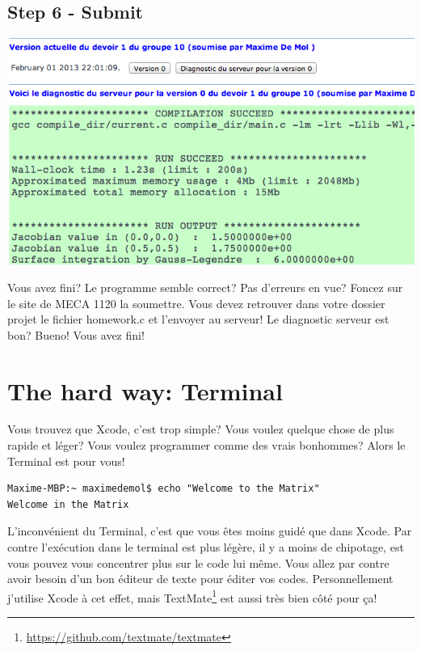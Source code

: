 \documentclass[11pt,a4paper]{article}
\begin{document}
\subsection{Step 6 - Submit}
\label{subsec:submit}
\begin{minipage}[c]{.40\linewidth}
\includegraphics[width=\linewidth]{submit.png}
\end{minipage} \hfill
\begin{minipage}[c]{.50\linewidth}
Vous avez fini? Le programme semble correct? Pas d'erreurs en vue? Foncez sur le site de MECA 1120 la soumettre. Vous devez retrouver dans votre dossier projet le fichier homework.c et l'envoyer au serveur! Le diagnostic serveur est bon? Bueno! Vous avez fini!
\end{minipage}

\section{The hard way: Terminal}

Vous trouvez que Xcode, c'est trop simple? Vous voulez quelque chose de plus rapide et léger? Vous voulez programmer comme des vrais bonhommes? Alors le Terminal est pour vous!\\

\begin{lstlisting}[style=Bash]
Maxime-MBP:~ maximedemol$ echo "Welcome to the Matrix"
Welcome in the Matrix
\end{lstlisting}
\vspace{12pt}

L'inconvénient du Terminal, c'est que vous êtes moins guidé que dans Xcode. Par contre l'exécution dans le terminal est plus légère, il y a moins de chipotage, est vous pouvez vous concentrer plus sur le code lui même. Vous allez par contre avoir besoin d'un bon éditeur de texte pour éditer vos codes. Personnellement j'utilise Xcode à cet effet, mais TextMate\footnote{\url{https://github.com/textmate/textmate}} est aussi très bien côté pour ça!\\
\end{document}
